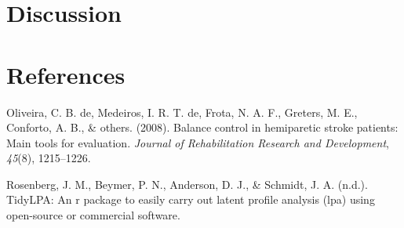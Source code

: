 \documentclass[man]{apa6}
\begin{document}
\section{Discussion}\label{discussion}

\newpage

\section{References}\label{references}

\begingroup
\setlength{\parindent}{-0.5in} \setlength{\leftskip}{0.5in}

\hypertarget{refs}{}
\hypertarget{ref-oliveira2008balance}{}
Oliveira, C. B. de, Medeiros, I. R. T. de, Frota, N. A. F., Greters, M.
E., Conforto, A. B., \& others. (2008). Balance control in hemiparetic
stroke patients: Main tools for evaluation. \emph{Journal of
Rehabilitation Research and Development}, \emph{45}(8), 1215--1226.

\hypertarget{ref-rosenbergtidylpa}{}
Rosenberg, J. M., Beymer, P. N., Anderson, D. J., \& Schmidt, J. A.
(n.d.). TidyLPA: An r package to easily carry out latent profile
analysis (lpa) using open-source or commercial software.

\endgroup
\end{document}
